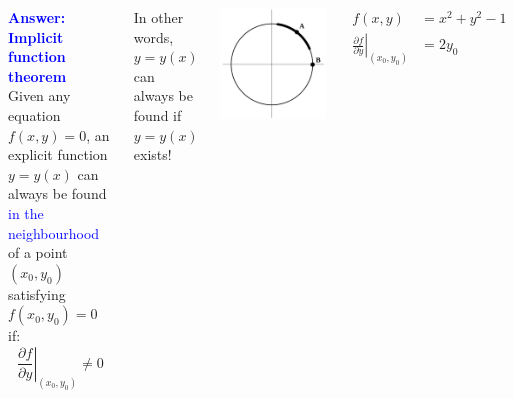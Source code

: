 \documentclass[xcolor=x11names,compress]{beamer}
\renewcommand{\(}{\begin{columns}}
\renewcommand{\)}{\end{columns}}
\newcommand{\<}[1]{\begin{column}{#1}}
\renewcommand{\>}{\end{column}}
\newcommand{\hlb}[1]{\textbf{\textcolor{blue}{#1}}}
\newcommand{\hl}[1]{\textcolor{blue}{#1}}
\begin{document}
\begin{frame}
\begin{columns}[c]
\hlb{ Answer: Implicit function theorem}\\


Given any equation $f(x,y)=0$, an explicit function $y=y(x)$ can always be 
found \hl{ in the neighbourhood} of a point $(x_0,y_0)$ satisfying $f(x_0,y_0)=0$
if:
\[
\left.  \frac{\partial f}{\partial y}\right|_{(x_0,y_0)}\neq 0
\]

\pause{}
In other words, $y=y(x)$ can always be found if $y=y(x)$ exists!

\begin{center}
\includegraphics[width=\textwidth]{implicit_circle}
\end{center}
\begin{align*}
f(x,y)&=x^2+y^2-1\\
\left.  \frac{\partial f}{\partial y}\right|_{(x_0,y_0)}&=2y_0
\end{align*}
\end{columns}
\end{frame}
\end{document}
